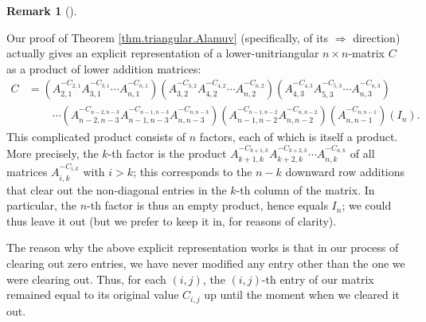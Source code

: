 \documentclass[numbers=enddot,12pt,final,onecolumn,notitlepage]{scrartcl}%
\theoremstyle{definition}
\newtheorem{remk}[theo]{Remark}
\newenvironment{remark}[1][]
{\begin{remk}[#1]\begin{leftbar}}
{\end{leftbar}\end{remk}}
\begin{document}
\begin{remark}
Our proof of Theorem \ref{thm.triangular.Alamuv} (specifically, of its
$\Longrightarrow$ direction) actually gives an explicit representation of a
lower-unitriangular $n\times n$-matrix $C$ as a product of lower addition
matrices:%
\begin{align*}
C  &  =\left(  A_{2,1}^{-C_{2,1}}A_{3,1}^{-C_{3,1}}\cdots A_{n,1}^{-C_{n,1}%
}\right)  \left(  A_{3,2}^{-C_{3,2}}A_{4,2}^{-C_{4,2}}\cdots A_{n,2}%
^{-C_{n,2}}\right)  \left(  A_{4,3}^{-C_{4,3}}A_{5,3}^{-C_{5,3}}\cdots
A_{n,3}^{-C_{n,3}}\right) \\
&  \ \ \ \ \ \ \ \ \ \ \cdots\left(  A_{n-2,n-3}^{-C_{n-2,n-3}}A_{n-1,n-3}%
^{-C_{n-1,n-3}}A_{n,n-3}^{-C_{n,n-3}}\right)  \left(  A_{n-1,n-2}%
^{-C_{n-1,n-2}}A_{n,n-2}^{-C_{n,n-2}}\right)  \left(  A_{n,n-1}^{-C_{n,n-1}%
}\right)  \left(  I_{n}\right)  .
\end{align*}
This complicated product consists of $n$ factors, each of which is itself a
product. More precisely, the $k$-th factor is the product $A_{k+1,k}%
^{-C_{k+1,k}}A_{k+2,k}^{-C_{k+2,k}}\cdots A_{n,k}^{-C_{n,k}}$ of all matrices
$A_{i,k}^{-C_{i,k}}$ with $i>k$; this corresponds to the $n-k$ downward row
additions that clear out the non-diagonal entries in the $k$-th column of the
matrix. In particular, the $n$-th factor is thus an empty product, hence
equals $I_{n}$; we could thus leave it out (but we prefer to keep it in, for
reasons of clarity).

The reason why the above explicit representation works is that in our process
of clearing out zero entries, we have never modified any entry other than the
one we were clearing out. Thus, for each $\left(  i,j\right)  $, the $\left(
i,j\right)  $-th entry of our matrix remained equal to its original value
$C_{i,j}$ up until the moment when we cleared it out.
\end{remark}
\end{document}
